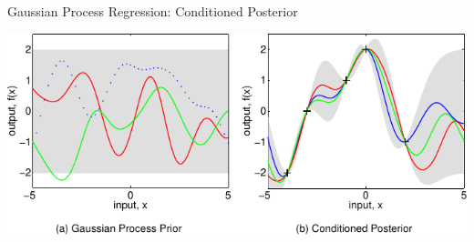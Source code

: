 \documentclass[10pt, compress, aspectratio=169, xcolor={table,usenames,dvipsnames}]{beamer}
\begin{document}
\begin{frame}[label={sec:orgd2561f8}]{Gaussian Process Regression: Conditioned Posterior}
\begin{center}
\includegraphics[width=.99\columnwidth]{../../../img/rasmussen_prior_posterior.pdf}
\end{center}

\end{frame}
\end{document}
